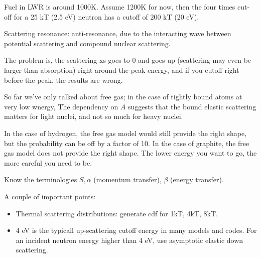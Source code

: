 \documentclass{school-22.211-notes}
\begin{document}
Fuel in LWR is around 1000K. Assume 1200K for now, then the four times cut-off for a 25 kT (2.5 eV) neutron has a cutoff of 200 kT (20 eV). 

Scattering resonance: anti-resonance, due to the interacting wave between potential scattering and compound nuclear scattering. 

The problem is, the scattering xs goes to 0 and goes up (scattering may even be larger than absorption) right around the peak energy, and if you cutoff right before the peak, the results are wrong. 

So far we've only talked about free gas; in the case of tightly bound atoms at very low wnergy, 
The dependency on $A$ suggests that the bound elastic scattering matters for light nuclei, and not so much for heavy nuclei. 

In the case of hydrogen, the free gas model would still provide the right shape, but the probability can be off by a factor of 10. In the case of graphite, the free gas model does not provide the right shape. The lower energy you want to go, the more careful you need to be. 

Know the terminologies $S, \alpha$ (momentum transfer), $\beta$ (energy transfer). 

A couple of important points:
\begin{itemize}
\item Thermal scattering distributions: generate cdf for 1kT, 4kT, 8kT.  
\item 4 eV is the typicall up-scattering cutoff energy in many models and codes. For an incident neutron energy higher than 4 eV, use asymptotic elastic down scattering. 
\end{itemize}
\end{document}
